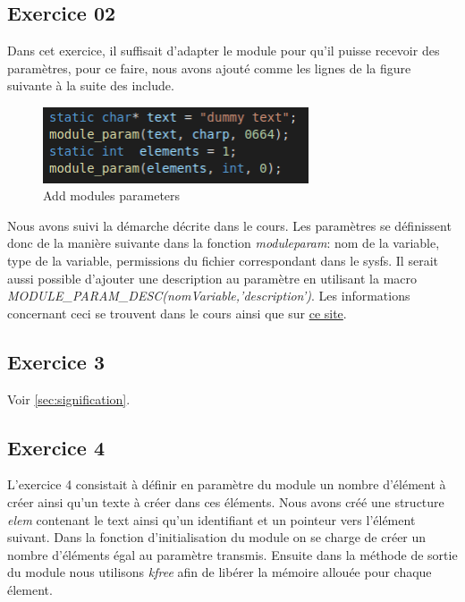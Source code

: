 \documentclass{ReportTemplate}
\begin{document}
\subsection{Exercice 02}
Dans cet exercice, il suffisait d'adapter le module pour qu'il puisse recevoir
des paramètres, pour ce faire, nous avons ajouté comme les lignes de la figure
suivante à la suite des include.
\begin{figure}[H]
    \centering
    \includegraphics[width=0.7\textwidth]{imageSources/ModuleParams.png}
    \caption{Add modules parameters}
    \label{fig:ModuleParams}
\end{figure}
Nous avons suivi la démarche décrite dans le cours. Les paramètres se
définissent donc de la manière suivante dans la fonction \textit{moduleparam}: \newline
nom de la variable, type de la variable, permissions du fichier correspondant
dans le sysfs. Il serait aussi possible d'ajouter une description au paramètre
en utilisant la macro \textit{MODULE\_PARAM\_DESC(nomVariable,'description')}. Les
informations concernant ceci se trouvent dans le cours ainsi que sur
\href{https://linuxkernel51.blogspot.com/2011/03/use-of-module-parameters-in-kernel.html}{ce
site}.
\subsection{Exercice 3}
Voir \ref{sec:signification}.
\subsection{Exercice 4}
L'exercice 4 consistait à définir en paramètre du module un nombre d'élément à
créer ainsi qu'un texte à créer dans ces éléments. Nous avons créé une structure
\textit{elem} contenant le text ainsi qu'un identifiant et un pointeur vers
l'élément suivant. Dans la fonction d'initialisation du module on se charge de
créer un nombre d'éléments égal au paramètre transmis. Ensuite dans la méthode
de sortie du module nous utilisons \textit{kfree} afin de libérer la mémoire
allouée pour chaque élement.
\end{document}
